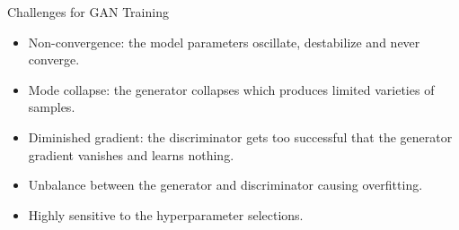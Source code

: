 \begin{frame} {Challenges for GAN Training}

  \begin{itemize}
    \item Non-convergence: the model parameters oscillate, destabilize and never converge.
    \item Mode collapse: the generator collapses which produces limited varieties of samples.
     \item Diminished gradient: the discriminator gets too successful that the generator gradient vanishes and learns nothing.
     \item Unbalance between the generator and discriminator causing overfitting.
     \item Highly sensitive to the hyperparameter selections.
  \end{itemize}
\end{frame}



